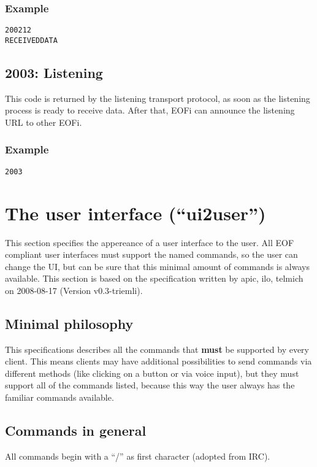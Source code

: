 \documentclass[12pt,a4paper]{book}
\begin{document}
\subsubsection{Example}
\begin{verbatim}
200212
RECEIVEDDATA
\end{verbatim}
\subsection{2003: Listening}
This code is returned by the listening transport protocol, as soon as the
listening process is ready to receive data. After that, EOFi can announce
the listening URL to other EOFi.
\subsubsection{Example}
\begin{verbatim}
2003
\end{verbatim}
\section{The user interface ("`ui2user"')}
This section specifies the appereance of a user interface to the user.
All EOF compliant user interfaces must support the named commands, so the
user can change the UI, but can be sure that this minimal amount of
commands is always available.  This section is based on the specification
written by apic, ilo, telmich on 2008-08-17 (Version v0.3-triemli).

\subsection{Minimal philosophy}
This specifications describes all the commands that \textbf{must} be
supported by every client. This means clients may have additional possibilities
to send commands via different methods (like clicking on a button or via
voice input), but they must support all of the commands listed, because this
way the user always has the familiar commands available.

\subsection{Commands in general}
All commands begin with a "`/"' as first character (adopted from IRC).
\end{document}
